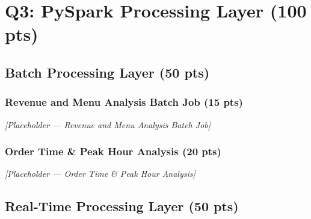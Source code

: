 \documentclass[a4paper,12pt]{extarticle}
\begin{document}
\section{Q3: PySpark Processing Layer (100 pts)}

\subsection{Batch Processing Layer (50 pts)}

\subsubsection{Revenue and Menu Analysis Batch Job (15 pts)}




\textit{[Placeholder — Revenue and Menu Analysis Batch Job]}

\subsubsection{Order Time \& Peak Hour Analysis (20 pts)}



\textit{[Placeholder — Order Time \& Peak Hour Analysis]}

\subsection{Real-Time Processing Layer (50 pts)}
\end{document}
